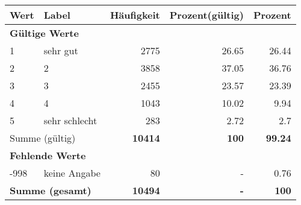      \begin{longtable}{lXrrr}
     \toprule
     \textbf{Wert} & \textbf{Label} & \textbf{Häufigkeit} & \textbf{Prozent(gültig)} & \textbf{Prozent} \\
     \endhead
     \midrule
     \multicolumn{5}{l}{\textbf{Gültige Werte}}\\

     1 &
     \multicolumn{1}{X}{ sehr gut   } &


       \num{2775} &
       \num[round-mode=places,round-precision=2]{26.65} &
         \num[round-mode=places,round-precision=2]{26.44} \\

     2 &
     \multicolumn{1}{X}{ 2   } &


       \num{3858} &
       \num[round-mode=places,round-precision=2]{37.05} &
         \num[round-mode=places,round-precision=2]{36.76} \\

     3 &
     \multicolumn{1}{X}{ 3   } &


       \num{2455} &
       \num[round-mode=places,round-precision=2]{23.57} &
         \num[round-mode=places,round-precision=2]{23.39} \\

     4 &
     \multicolumn{1}{X}{ 4   } &


       \num{1043} &
       \num[round-mode=places,round-precision=2]{10.02} &
         \num[round-mode=places,round-precision=2]{9.94} \\

     5 &
     \multicolumn{1}{X}{ sehr schlecht   } &


       \num{283} &
       \num[round-mode=places,round-precision=2]{2.72} &
         \num[round-mode=places,round-precision=2]{2.7} \\
     \midrule
     \multicolumn{2}{l}{Summe (gültig)} &
       \textbf{\num{10414}} &
     \textbf{\num{100}} &
       \textbf{\num[round-mode=places,round-precision=2]{99.24}} \\
     \multicolumn{5}{l}{\textbf{Fehlende Werte}}\\
       -998 &
       keine Angabe &
         \num{80} &
        - &
         \num[round-mode=places,round-precision=2]{0.76} \\
     \midrule
     \multicolumn{2}{l}{\textbf{Summe (gesamt)}} &
          \textbf{\num{10494}} &
        \textbf{-} &
        \textbf{\num{100}} \\
     \bottomrule
     \end{longtable}
     
